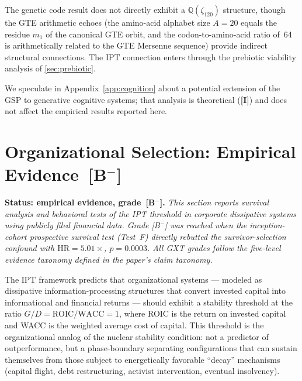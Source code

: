 \documentclass[11pt]{article}
\theoremstyle{remark}
\newcommand{\IPT}{\mathrm{IPT}}
\newcommand{\zetaN}[1]{\zeta_{#1}}
\begin{document}
The genetic code result does not directly exhibit a $\mathbb{Q}(\zetaN{120})$
structure, though the GTE arithmetic echoes (the amino-acid alphabet size $A=20$
equals the residue $m_1$ of the canonical GTE orbit, and the codon-to-amino-acid
ratio of~64 is arithmetically related to the GTE Mersenne sequence) provide
indirect structural connections.
The $\IPT$ connection enters through the prebiotic viability analysis of
\cref{sec:prebiotic}.


We speculate in Appendix~\ref{app:cognition} about a potential extension of
the GSP to generative cognitive systems; that analysis is theoretical
(\textbf{[I]}) and does not affect the empirical results reported here.

\section{Organizational Selection: Empirical Evidence~\textbf{[B$^-$]}}
\label{sec:org}

\noindent\textbf{Status: empirical evidence, grade~\textbf{[B$^-$]}.}
\emph{This section reports survival analysis and behavioral tests of the IPT threshold
in corporate dissipative systems using publicly filed financial data.
Grade [B$^-$] was reached when the inception-cohort prospective survival test
(Test~F) directly rebutted the survivor-selection confound
with $\mathrm{HR}=5.01\times$, $p=0.0003$.
All GXT grades follow the five-level evidence taxonomy defined in the paper's claim taxonomy.}

\smallskip

The IPT framework predicts that organizational systems --- modeled as
dissipative information-processing structures that convert invested capital
into informational and financial returns --- should exhibit a stability threshold
at the ratio $G/D = \mathrm{ROIC}/\mathrm{WACC} = 1$, where ROIC is the return
on invested capital and WACC is the weighted average cost of capital.
This threshold is the organizational analog of the nuclear stability
condition: not a predictor of outperformance, but a phase-boundary separating
configurations that can sustain themselves from those subject to energetically
favorable ``decay'' mechanisms (capital flight, debt restructuring, activist
intervention, eventual insolvency).
\end{document}
